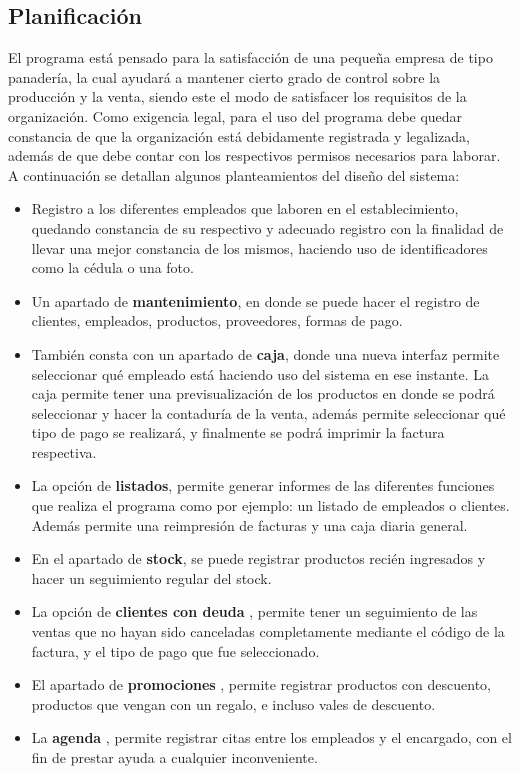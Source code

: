 \documentclass[12pt]{article}
\begin{document}
\subsection{Planificación}
El programa está pensado para la satisfacción de una pequeña empresa de tipo panadería, la cual ayudará a mantener cierto grado de control sobre la producción y la venta, siendo este el modo de satisfacer los requisitos de la organización. Como exigencia legal, para el uso del programa debe quedar constancia de que la organización está debidamente registrada y legalizada, además de que debe contar con los respectivos permisos necesarios para laborar. A continuación se detallan algunos planteamientos del diseño del sistema:
\begin{itemize}
	\item Registro a los diferentes empleados que laboren en el establecimiento, quedando constancia de su respectivo y adecuado registro con la finalidad de llevar una mejor constancia de los mismos, haciendo uso de identificadores como la cédula o una foto.
	\item Un apartado de \textbf{mantenimiento}, en donde se puede hacer el registro de clientes, empleados, productos, proveedores, formas de pago.
	\item También consta con un apartado de \textbf{caja}, donde una nueva interfaz permite seleccionar qué empleado está haciendo uso del sistema en ese instante. La caja permite tener una previsualización de los productos en donde se podrá  seleccionar y hacer la contaduría de la venta, además permite seleccionar qué tipo de pago se realizará, y finalmente se podrá imprimir la factura respectiva.
	\item La opción de \textbf{listados}, permite generar informes de las diferentes funciones que realiza el programa como por ejemplo: un listado de empleados o clientes. Además permite una reimpresión de facturas y una caja diaria general.
	\item En el apartado de \textbf{stock}, se puede registrar productos recién ingresados y hacer un seguimiento regular del stock.
	\item La opción de \textbf{clientes con deuda} , permite tener un seguimiento de las ventas que no hayan sido canceladas completamente mediante el código de la factura, y el tipo de pago que fue seleccionado.
	\item El apartado de \textbf{promociones} , permite registrar productos con descuento, productos que vengan con un regalo, e incluso vales de descuento.
	\item La \textbf{agenda} , permite registrar citas entre los empleados y el encargado, con el fin de prestar ayuda a cualquier inconveniente.

\end{itemize}
\end{document}
